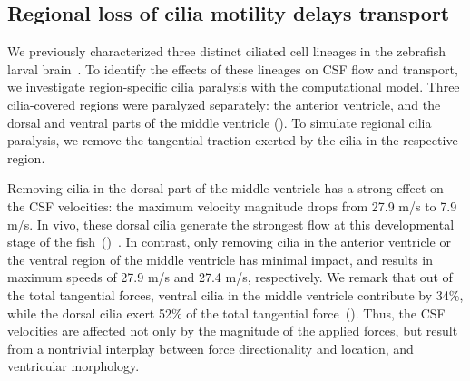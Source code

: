 \documentclass{WileyMSP-template}
\begin{document}
\subsection{Regional loss of cilia motility delays transport}

We previously characterized three distinct ciliated cell lineages in
the zebrafish larval brain~\cite{Olstad2019CiliaryDevelopment,
  DGama2025MotileBrain}.  To identify the effects of these lineages on
CSF flow and transport, we investigate region-specific cilia paralysis
with the computational model.  Three cilia-covered regions were
paralyzed separately: the anterior ventricle, and the dorsal and
ventral parts of the middle ventricle ().  To
simulate regional cilia paralysis, we remove the tangential traction exerted by
the cilia in the respective region.

Removing cilia in the dorsal part of the middle ventricle has a strong
effect on the CSF velocities: the maximum velocity magnitude drops
from 27.9 \textmu m/s to 7.9 \textmu m/s. In vivo, these dorsal cilia
generate the strongest flow at this developmental stage of the
fish~()~\cite{Olstad2019CiliaryDevelopment}.
In contrast, only removing cilia in the anterior ventricle or the
ventral region of the middle ventricle has minimal impact, and results
in maximum speeds of 27.9 \textmu m/s and 27.4 \textmu m/s,
respectively.  We remark that out of the total tangential forces,
ventral cilia in the middle ventricle contribute by 34\%, while the
dorsal cilia exert 52\% of the total tangential
force~().
Thus, the CSF velocities are affected not only by
the magnitude of the applied forces, but result
from a nontrivial interplay between force directionality
and location, and ventricular morphology.
\end{document}
